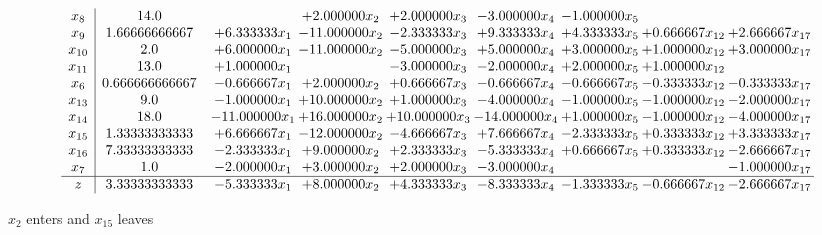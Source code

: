 \documentclass[10pt]{article}
\begin{document}
 \[\begin{array}{c| c c@{\hskip 2pt} c@{\hskip 2pt} c@{\hskip 2pt} c@{\hskip 2pt} c@{\hskip 2pt} c@{\hskip 2pt} c@{\hskip 2pt} }
 x_{8}   &  14.0  &   & + 2.000000 x_{2} & + 2.000000 x_{3} & -3.000000 x_{4} & -1.000000 x_{5} &    &   \\
 x_{9}   &  1.66666666667 & + 6.333333 x_{1} & -11.000000 x_{2} & -2.333333 x_{3} & + 9.333333 x_{4} & + 4.333333 x_{5} & + 0.666667 x_{12} & + 2.666667 x_{17}\\
 x_{10}   &  2.0 & + 6.000000 x_{1} & -11.000000 x_{2} & -5.000000 x_{3} & + 5.000000 x_{4} & + 3.000000 x_{5} & + 1.000000 x_{12} & + 3.000000 x_{17}\\
 x_{11}   &  13.0 & + 1.000000 x_{1} &   & -3.000000 x_{3} & -2.000000 x_{4} & + 2.000000 x_{5} & + 1.000000 x_{12} &   \\
 x_{6}   &  0.666666666667 & -0.666667 x_{1} & + 2.000000 x_{2} & + 0.666667 x_{3} & -0.666667 x_{4} & -0.666667 x_{5} & -0.333333 x_{12} & -0.333333 x_{17}\\
 x_{13}   &  9.0 & -1.000000 x_{1} & + 10.000000 x_{2} & + 1.000000 x_{3} & -4.000000 x_{4} & -1.000000 x_{5} & -1.000000 x_{12} & -2.000000 x_{17}\\
 x_{14}   &  18.0 & -11.000000 x_{1} & + 16.000000 x_{2} & + 10.000000 x_{3} & -14.000000 x_{4} & + 1.000000 x_{5} & -1.000000 x_{12} & -4.000000 x_{17}\\
 x_{15}   &  1.33333333333 & + 6.666667 x_{1} & -12.000000 x_{2} & -4.666667 x_{3} & + 7.666667 x_{4} & -2.333333 x_{5} & + 0.333333 x_{12} & + 3.333333 x_{17}\\
 x_{16}   &  7.33333333333 & -2.333333 x_{1} & + 9.000000 x_{2} & + 2.333333 x_{3} & -5.333333 x_{4} & + 0.666667 x_{5} & + 0.333333 x_{12} & -2.666667 x_{17}\\
 x_{7}   &  1.0 & -2.000000 x_{1} & + 3.000000 x_{2} & + 2.000000 x_{3} & -3.000000 x_{4} &    &   & -1.000000 x_{17}\\
\hline
z    &  3.33333333333 & -5.333333 x_{1} & + 8.000000 x_{2} & + 4.333333 x_{3} & -8.333333 x_{4} & -1.333333 x_{5} & -0.666667 x_{12} & -2.666667 x_{17}\\
\end{array}\]


 $ x_{2} $ enters and $ x_{15} $ leaves 
\end{document}
